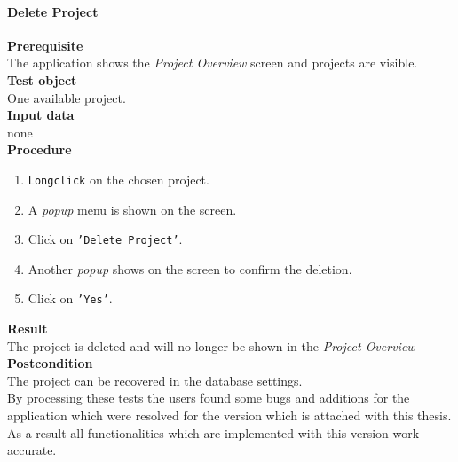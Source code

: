 \paragraph*{\textbf{Delete Project}}
\textbf{Prerequisite}\\
The application shows the \textit{Project Overview} screen and projects are visible.\\
\textbf{Test object}\\
One available project.\\
\textbf{Input data}\\
none\\
\textbf{Procedure}
\begin{enumerate}
	\item \texttt{Longclick} on the chosen project.
	\item A \textit{popup} menu is shown on the screen.
	\item Click on \texttt{'Delete Project'}.
	\item Another \textit{popup} shows on the screen to confirm the deletion.
	\item Click on \texttt{'Yes'}.
\end{enumerate}
\textbf{Result}\\
The project is deleted and will no longer be shown in the \textit{Project Overview}\\
\textbf{Postcondition}\\
The project can be recovered in the database settings.\\
By processing these tests the users found some bugs and additions for the application which were resolved for the version which is attached with this thesis. As a result all functionalities which are implemented with this version work accurate.